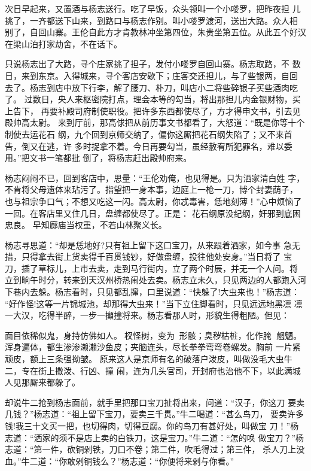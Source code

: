 次日早起来，又置酒与杨志送行。吃了早饭，众头领叫一个小喽罗，把昨夜担
儿挑了，一齐都送下山来，到路口与杨志作别。叫小喽罗渡河，送出大路。众人相
别了，自回山寨。王伦自此方才肯教林冲坐第四位，朱贵坐第五位。从此五个好汉
在梁山泊打家劫舍，不在话下。

只说杨志出了大路，寻个庄家挑了担子，发付小喽罗自回山寨。杨志取路，不
数日，来到东京。入得城来，寻个客店安歇下；庄客交还担儿，与了些银两，自回
去了。杨志到店中放下行李，解了腰刀、朴刀，叫店小二将些碎银子买些酒肉吃了。
过数日，央人来枢密院打点，理会本等的勾当，将出那担儿内金银财物，买上告下，
再要补殿司府制使职役。把许多东西都使尽了，方才得申文书，引去见殿帅高太尉。
来到厅前，那高俅把从前历事文书都看了，大怒道：“既是你等十个制使去运花石
纲，九个回到京师交纳了，偏你这厮把花石纲失陷了；又不来首告，倒又在逃，许
多时捉拿不着。今日再要勾当，虽经赦宥所犯罪名，难以委用。”把文书一笔都批
倒了，将杨志赶出殿帅府来。

杨志闷闷不已，回到客店中，思量：“王伦劝俺，也见得是。只为洒家清白姓
字，不肯将父母遗体来玷污了。指望把一身本事，边庭上一枪一刀，博个封妻荫子，
也与祖宗争口气；不想又吃这一闪。高太尉，你忒毒害，恁地刻薄！”心中烦恼了
一回。在客店里又住几日，盘缠都使尽了。正是：
花石纲原没纪纲，奸邪到底困忠良。
早知廊庙当权重，不若山林聚义长。

杨志寻思道：“却是恁地好?只有祖上留下这口宝刀，从来跟着洒家，如今事
急无措，只得拿去街上货卖得千百贯钱钞，好做盘缠，投往他处安身。”当日将了
宝刀，插了草标儿，上市去卖，走到马行街内，立了两个时辰，并无一个人问。将
立到晌午时分，转来到天汉州桥热闹处去卖。杨志立未久，只见两边的人都跑入河
下巷内去躲。杨志看时，只见都乱撺，口里说道：“快躲了!大虫来也！”杨志道：
“好作怪!这等一片锦城池，却那得大虫来！”当下立住脚看时，只见远远地黑凛
凛一大汉，吃得半醉，一步一攧撞将来。杨志看那人时，形貌生得粗陋。但见：

面目依稀似鬼，身持仿佛如人。杈怪树，变为形骸；臭秽枯桩，化作腌
魍魉。浑身遍体，都生渗渗濑濑沙鱼皮；夹脑连头，尽长拳拳弯弯卷螺发。胸前
一片紧顽皮，额上三条强拗皱。
原来这人是京师有名的破落户泼皮，叫做没毛大虫牛二，专在街上撒泼、行凶、撞
闹，连为几头官司，开封府也治他不下，以此满城人见那厮来都躲了。

却说牛二抢到杨志面前，就手里把那口宝刀扯将出来，问道：“汉子，你这刀
要卖几钱？”杨志道：“祖上留下宝刀，要卖三千贯。”牛二喝道：“甚么鸟刀，
要卖许多钱!我三十文买一把，也切得肉，切得豆腐。你的鸟刀有甚好处，叫做宝
刀！”杨志道：“洒家的须不是店上卖的白铁刀，这是宝刀。”牛二道：“怎的唤
做宝刀？”杨志道：“第一件，砍铜剁铁，刀口不卷；第二件，吹毛得过；第三件，
杀人刀上没血。”牛二道：“你敢剁铜钱么？”杨志道：“你便将来剁与你看。”

